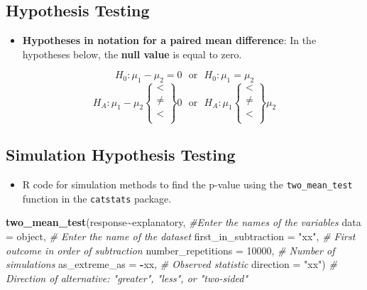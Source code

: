 \documentclass[
]{report}
\newenvironment{Shaded}{\begin{snugshade}}{\end{snugshade}}
\newcommand{\AttributeTok}[1]{\textcolor[rgb]{0.13,0.29,0.53}{#1}}
\newcommand{\CommentTok}[1]{\textcolor[rgb]{0.56,0.35,0.01}{\textit{#1}}}
\newcommand{\DecValTok}[1]{\textcolor[rgb]{0.00,0.00,0.81}{#1}}
\newcommand{\FunctionTok}[1]{\textcolor[rgb]{0.13,0.29,0.53}{\textbf{#1}}}
\newcommand{\NormalTok}[1]{#1}
\newcommand{\SpecialCharTok}[1]{\textcolor[rgb]{0.81,0.36,0.00}{\textbf{#1}}}
\newcommand{\StringTok}[1]{\textcolor[rgb]{0.31,0.60,0.02}{#1}}
\providecommand{\tightlist}{%
  \setlength{\itemsep}{0pt}\setlength{\parskip}{0pt}}
\begin{document}
\subsection*{Hypothesis Testing}\label{hypothesis-testing}

\begin{itemize}
\tightlist
\item
  \textbf{Hypotheses in notation for a paired mean difference}: In the hypotheses below, the \textbf{null value} is equal to zero.
\end{itemize}

\[H_0: \mu_1 - \mu_2 = 0 ~~~ \text{or}~~~ H_0: \mu_1 = \mu_2 \]
\[H_A: \mu_1 - \mu_2 \left\{
\begin{array}{ll}
< \\
\ne \\
< \\
\end{array}
\right\}
0 
~~~ \text{or} ~~~ H_A:
\mu_1 \left\{
\begin{array}{ll}
< \\
\ne \\
< \\
\end{array}
\right\}
\mu_2 \]

\subsection*{Simulation Hypothesis Testing}\label{simulation-hypothesis-testing}

\begin{itemize}
\tightlist
\item
  R code for simulation methods to find the p-value using the \texttt{two\_mean\_test} function in the \texttt{catstats} package.
\end{itemize}

\begin{Shaded}
\begin{Highlighting}[]
\FunctionTok{two\_mean\_test}\NormalTok{(response}\SpecialCharTok{\textasciitilde{}}\NormalTok{explanatory, }\CommentTok{\#Enter the names of the variables }
               \AttributeTok{data =}\NormalTok{ object,  }\CommentTok{\# Enter the name of the dataset}
              \AttributeTok{first\_in\_subtraction =} \StringTok{"xx"}\NormalTok{, }\CommentTok{\# First outcome in order of subtraction }
               \AttributeTok{number\_repetitions =} \DecValTok{10000}\NormalTok{,  }\CommentTok{\# Number of simulations }
               \AttributeTok{as\_extreme\_as =} \SpecialCharTok{{-}}\NormalTok{xx,  }\CommentTok{\# Observed statistic }
               \AttributeTok{direction =} \StringTok{"xx"}\NormalTok{)  }\CommentTok{\# Direction of alternative: "greater", "less", or "two{-}sided"}
\end{Highlighting}
\end{Shaded}
\end{document}
